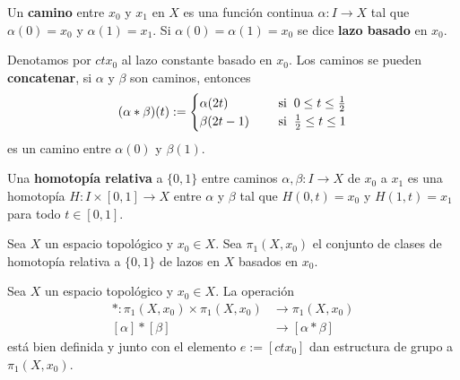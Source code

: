 \documentclass{article}
\begin{document}
\vspace{2mm}
\begin{dfn}
    Un \textbf{camino} entre $x_{0}$ y $x_{1}$ en $X$ es una función continua $\alpha:I\to X$ tal 
    que $\alpha(0)=x_{0}$ y $\alpha(1)=x_{1}$. Si $\alpha(0)=\alpha(1)=x_{0}$ se dice 
    \textbf{lazo basado} en $x_{0}$.
\end{dfn}

\vspace{2mm}
\noindent Denotamos por $ctx_{0}$ al lazo constante basado en $x_{0}$. Los caminos se pueden 
\textbf{concatenar}, si $\alpha$ y $\beta$ son caminos, entonces
\begin{equation*}
    (\alpha*\beta)(t):=\begin{cases}
        \alpha(2t) &\quad\text{ si}\hspace{2mm}0\leq t\leq\frac{1}{2} \\
        \beta(2t-1) &\quad\text{ si}\hspace{2mm}\frac{1}{2}\leq t\leq1
    \end{cases}
\end{equation*}
es un camino entre $\alpha(0)$ y $\beta(1)$.

\vspace{2mm}
\begin{dfn}
    Una \textbf{homotopía relativa} a $\{0,1\}$ entre caminos $\alpha,\beta:I\to X$ de $x_{0}$ a 
    $x_{1}$ es una homotopía $H:I\times[0,1]\to X$ entre $\alpha$ y $\beta$ tal que $H(0,t)=x_{0}$ 
    y $H(1,t)=x_{1}$ para todo $t\in[0,1]$.
\end{dfn}

\vspace{2mm}
\begin{dfn}
    Sea $X$ un espacio topológico y $x_{0}\in X$. Sea $\pi_{1}(X,x_{0})$ el conjunto de clases de 
    homotopía relativa a $\{0,1\}$ de lazos en $X$ basados en $x_{0}$.
\end{dfn}

\begin{teo}
    Sea $X$ un espacio topológico y $x_{0}\in X$. La operación
    \begin{align*}
        *:\pi_{1}(X,x_{0})\times\pi_{1}(X,x_{0}) &\to \pi_{1}(X,x_{0}) \\
        [\alpha]*[\beta] &\to [\alpha*\beta]
    \end{align*}
    está bien definida y junto con el elemento $e:=[ctx_{0}]$ dan estructura de grupo a 
    $\pi_{1}(X,x_{0})$.
\end{teo}
\end{document}
